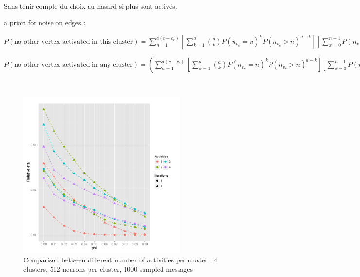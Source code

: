 \documentclass[english,11pt,twocolumn]{article}
\renewcommand{\ge}{\geqslant}
\theoremstyle{definition}
\begin{document}
	
	Sans tenir compte du choix au hasard si plus sont activés.
	
		a priori for noise on edges :

	$P(\mbox{no other vertex activated in this cluster})= \sum_{n = 1}^{a (c - c_e)} \left [ \sum_{k = 1}^{a} { a \choose k }   P(n_{v_c} = n)^k P(n_{v_c} > n)^{a-k} \right ] \left [ \sum_{x = 0}^{n - 1} P(n_v = x) \right]^{l-a }$
	
	$P(\mbox{no other vertex activated in any cluster})=  \left ( \sum_{n = 1}^{a ( c- c_e)} \left [ \sum_{k = 1}^{a} { a \choose k }   P(n_{v_c} = n)^k P(n_{v_c} > n)^{a-k} \right ] \left [ \sum_{x = 0}^{n - 1} P(n_v = x) \right]^{l-a } \right)^{c_e}$	
	
	\newpage
	$\,$
	\newpage
	\begin{figure}
		\includegraphics[width=8.5cm]{Courbes/1comppsic4l512g1}
		\caption{Comparison between different number of activities per cluster :  4 clusters, 512 neurons per cluster, 1000 sampled messages}
	\end{figure}

	
	
	\nocite{*}
         
\end{document}
